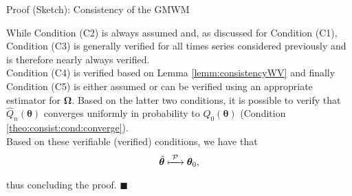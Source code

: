 \documentclass[envcountsect,usenames,dvipsnames]{beamer}
\theoremstyle{mystyle}
\begin{document}
\begin{frame}{Proof (Sketch): Consistency of the GMWM}
    
While Condition (C2) is always assumed and, as discussed for Condition (C1), Condition (C3) is generally verified for all times series considered previously and is therefore nearly always verified.\\[0.2cm]

Condition (C4) is verified based on Lemma \ref{lemm:consistencyWV} and finally Condition (C5) is either assumed or can be verified using an appropriate estimator for $\bm{\Omega}$. Based on the latter two conditions, it is possible to verify that $\hat{Q}_n(\bm{\theta})$ converges uniformly in probability to $Q_0(\bm{\theta})$ (Condition \ref{theo:consist:cond:converge}). \\[0.2cm]

Based on these verifiable (verified) conditions, we have that
$$\hat{\bm{\theta}}  \xmapsto[\;\;\;\;\; ]{\mathcal{P}} \bm{\theta}_0,$$
thus concluding the proof.
\hfill $\blacksquare$


\end{frame}
\end{document}
